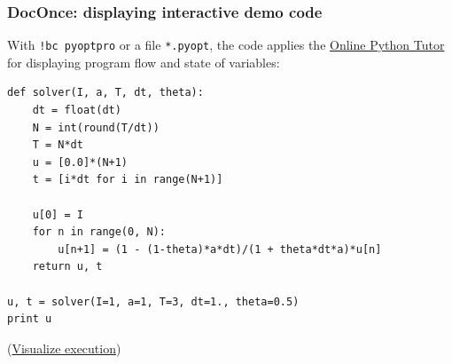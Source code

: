 \documentclass{beamer}
\begin{document}
\begin{frame}
\frametitle{DocOnce: displaying interactive demo code}

\label{slide:pot}
With \Verb?!bc pyoptpro? or a file \texttt{*.pyopt}, the code applies the
\href{{https://pythontutor.com}}{Online Python Tutor} for displaying
program flow and state of variables:
\begin{verbatim}
def solver(I, a, T, dt, theta):
    dt = float(dt)
    N = int(round(T/dt))
    T = N*dt
    u = [0.0]*(N+1)
    t = [i*dt for i in range(N+1)]

    u[0] = I
    for n in range(0, N):
        u[n+1] = (1 - (1-theta)*a*dt)/(1 + theta*dt*a)*u[n]
    return u, t

u, t = solver(I=1, a=1, T=3, dt=1., theta=0.5)
print u

\end{verbatim}

\noindent
(\href{{https://pythontutor.com/visualize.html\#code=def+solver\%28I\%2C+a\%2C+T\%2C+dt\%2C+theta\%29\%3A\%0A++++dt+\%3D+float\%28dt\%29\%0A++++N+\%3D+int\%28round\%28T\%2Fdt\%29\%29\%0A++++T+\%3D+N\%2Adt\%0A++++u+\%3D+\%5B0.0\%5D\%2A\%28N\%2B1\%29\%0A++++t+\%3D+\%5Bi\%2Adt+for+i+in+range\%28N\%2B1\%29\%5D\%0A\%0A++++u\%5B0\%5D+\%3D+I\%0A++++for+n+in+range\%280\%2C+N\%29\%3A\%0A++++++++u\%5Bn\%2B1\%5D+\%3D+\%281+-+\%281-theta\%29\%2Aa\%2Adt\%29\%2F\%281+\%2B+theta\%2Adt\%2Aa\%29\%2Au\%5Bn\%5D\%0A++++return+u\%2C+t\%0A\%0Au\%2C+t+\%3D+solver\%28I\%3D1\%2C+a\%3D1\%2C+T\%3D3\%2C+dt\%3D1.\%2C+theta\%3D0.5\%29\%0Aprint+u&mode=display&cumulative=false&heapPrimitives=false&drawParentPointers=false&textReferences=false&py=2&curInstr=0}}{Visualize execution})
\end{frame}
\end{document}
